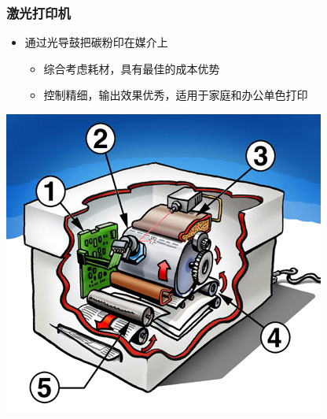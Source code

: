 \documentclass{beamer}
\newcommand{\fullPageImage}[2]{
	{
		\usebackgroundtemplate{\texttt{[image: \#1]}}
		\frame[plain]{#2}
	}
}
\begin{document}
\fullPageImage{images/bj-printer-flow.jpg}{\transwipe}
\fullPageImage{images/continous-flow-ink-jet.jpg}{\transwipe}%

\begin{frame}
	\frametitle{激光打印机}
	\begin{itemize}
		\item 通过光导鼓把碳粉印在媒介上
		\begin{itemize}
			\item 综合考虑耗材，具有最佳的成本优势
			\item 控制精细，输出效果优秀，适用于家庭和办公单色打印
		\end{itemize}
	\end{itemize}
	\begin{center}
	\includegraphics[height=.5\textheight]{images/laser-printer-principle.jpg}%
	\end{center}
\end{frame}

\fullPageImage{images/laserprinting.jpg}{\transwipe}
\end{document}
